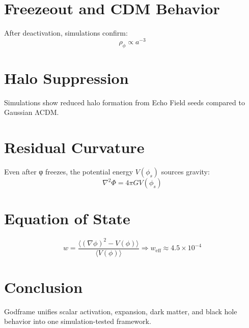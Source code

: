 \documentclass[11pt]{article}
\begin{document}
\section{Freezeout and CDM Behavior}
After deactivation, simulations confirm:
\[
\rho_\phi \propto a^{-3}
\]

\section{Halo Suppression}
Simulations show reduced halo formation from Echo Field seeds compared to Gaussian ΛCDM.

\section{Residual Curvature}
Even after φ freezes, the potential energy \(V(\phi_s)\) sources gravity:
\[
\nabla^2 \Phi = 4\pi G V(\phi_s)
\]

\section{Equation of State}
\[
w = \frac{\langle (\nabla \phi)^2 - V(\phi) \rangle}{\langle V(\phi) \rangle} \Rightarrow w_\text{eff} \approx 4.5 \times 10^{-4}
\]

\section{Conclusion}
Godframe unifies scalar activation, expansion, dark matter, and black hole behavior into one simulation-tested framework.
\end{document}
